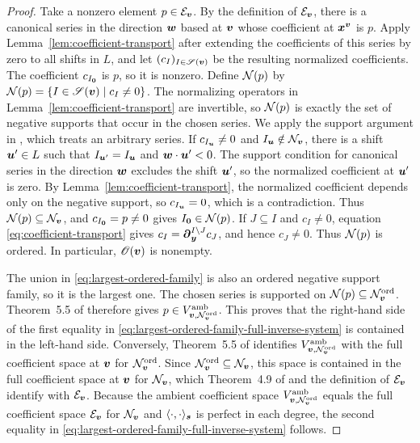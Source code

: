 \begin{proof}
	Take a nonzero element \(p\in\mathcal E_{\boldsymbol{v}}\).
	By the definition of \(\mathcal E_{\boldsymbol{v}}\), there is a canonical series in the direction \(\boldsymbol{w}\) based at \(\boldsymbol{v}\) whose coefficient at \(\boldsymbol{x}^{\boldsymbol{v}}\) is \(p\).
	Apply Lemma~\ref{lem:coefficient-transport} after extending the coefficients of this series by zero to all shifts in \(L\), and let \((c_I)_{I\in\mathscr S(\boldsymbol{v})}\) be the resulting normalized coefficients.
	The coefficient \(c_{I_{\boldsymbol{0}}}\) is \(p\), so it is nonzero.
	Define \(\mathcal N(p)\) by \(\mathcal N(p)=\{I\in\mathscr S(\boldsymbol{v})\mid c_I\ne0\}\).
	The normalizing operators in Lemma~\ref{lem:coefficient-transport} are invertible, so \(\mathcal N(p)\) is exactly the set of negative supports that occur in the chosen series.
	We apply the support argument in \cite[Lemma~4.8]{OS25}, which treats an arbitrary series.
	If \(c_{I_{\boldsymbol{u}}}\ne0\) and \(I_{\boldsymbol{u}}\notin\mathcal N_{\boldsymbol{v}}\), there is a shift \(\boldsymbol{u}'\in L\) such that \(I_{\boldsymbol{u}'}=I_{\boldsymbol{u}}\) and \(\boldsymbol{w}\cdot\boldsymbol{u}'<0\).
	The support condition for canonical series in the direction \(\boldsymbol{w}\) excludes the shift \(\boldsymbol{u}'\), so the normalized coefficient at \(\boldsymbol{u}'\) is zero.
	By Lemma~\ref{lem:coefficient-transport}, the normalized coefficient depends only on the negative support, so \(c_{I_{\boldsymbol{u}}}=0\), which is a contradiction.
	Thus \(\mathcal N(p)\subseteq\mathcal N_{\boldsymbol{v}}\), and \(c_{I_{\boldsymbol{0}}}=p\ne0\) gives \(I_{\boldsymbol{0}}\in\mathcal N(p)\).
	If \(J\subseteq I\) and \(c_I\ne0\), equation \eqref{eq:coefficient-transport} gives \(c_I=\boldsymbol{\partial}_{\boldsymbol{y}}^{I\setminus J}c_J\), and hence \(c_J\ne0\).
	Thus \(\mathcal N(p)\) is ordered.
	In particular, \(\mathscr O(\boldsymbol{v})\) is nonempty.

	The union in \eqref{eq:largest-ordered-family} is also an ordered negative support family, so it is the largest one.
	The chosen series is supported on \(\mathcal N(p)\subseteq\mathcal N_{\boldsymbol{v}}^{\mathrm{ord}}\).
	Theorem~5.5 of \cite{OS25} therefore gives \(p\in V_{\boldsymbol{v},\mathcal N_{\boldsymbol{v}}^{\mathrm{ord}}}^{\mathrm{amb}}\).
	This proves that the right-hand side of the first equality in \eqref{eq:largest-ordered-family-full-inverse-system} is contained in the left-hand side.
	Conversely, Theorem~5.5 of \cite{OS25} identifies \(V_{\boldsymbol{v},\mathcal N_{\boldsymbol{v}}^{\mathrm{ord}}}^{\mathrm{amb}}\) with the full coefficient space at \(\boldsymbol{v}\) for \(\mathcal N_{\boldsymbol{v}}^{\mathrm{ord}}\).
	Since \(\mathcal N_{\boldsymbol{v}}^{\mathrm{ord}}\subseteq\mathcal N_{\boldsymbol{v}}\), this space is contained in the full coefficient space at \(\boldsymbol{v}\) for \(\mathcal N_{\boldsymbol{v}}\), which Theorem~4.9 of \cite{OS25} and the definition of \(\mathcal E_{\boldsymbol{v}}\) identify with \(\mathcal E_{\boldsymbol{v}}\).
	Because the ambient coefficient space \(V_{\boldsymbol{v},\mathcal N_{\boldsymbol{v}}^{\mathrm{ord}}}^{\mathrm{amb}}\) equals the full coefficient space \(\mathcal E_{\boldsymbol{v}}\) for \(\mathcal N_{\boldsymbol{v}}\) and \(\langle\cdot,\cdot\rangle_{\boldsymbol{s}}\) is perfect in each degree, the second equality in \eqref{eq:largest-ordered-family-full-inverse-system} follows.
\end{proof}

